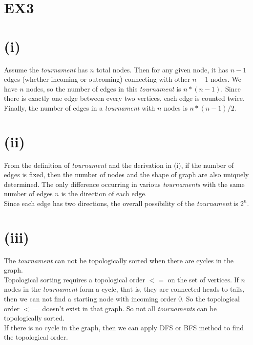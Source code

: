 \documentclass{article}
\begin{document}
\section*{EX3}
\section*{(i)}
    Assume the \emph{tournament} has $n$ total nodes. Then for any given node, 
it has $n-1$ edges (whether incoming or outcoming) connecting with other $n-1$ nodes.
We have $n$ nodes, so the number of edges in this \emph{tournament} is $n*(n-1)$.
Since there is exactly one edge between every two vertices, each edge is counted
twice. Finally, the number of edges in a \emph{tournament} with $n$ nodes is $n*(n-1)/2$.

\section*{(ii)}
    From the definition of \emph{tournament} and the derivation in (i), if the number 
of edges is fixed, then the number of nodes and the shape of graph are also uniquely
determined. The only difference occurring in various \emph{tournaments} with the same 
number of edges $n$ is the direction of each edge.\\
    Since each edge has two directions, the overall possibility of the \emph{tournament}
is $2^n$.

\section*{(iii)}
    The \emph{tournament} can not be topologically sorted when there are cycles in the graph.\\
    Topological sorting requires a topological order $<=$ on the set of vertices. If $n$
nodes in the \emph{tournament} form a cycle, that is, they are connected heads to tails, 
then we can not find a starting node with incoming order 0. So the topological order $<=$
doesn't exist in that graph. So not all \emph{tournaments} can be topologically sorted.\\    If there is no cycle in the graph, then we can apply DFS or BFS method to find the 
topological order.
\end{document}
